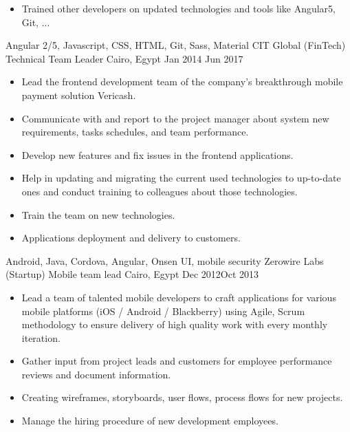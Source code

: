 \begin{experiences}
{\begin{itemize}
                \item Trained other developers on updated technologies and tools like Angular5, Git, ...
            \end{itemize}
        }
        {Angular 2/5, Javascript, CSS, HTML, Git, Sass, Material}
    \emptySeparator
    \experience
        {CIT Global (FinTech)}   {Technical Team Leader}
        {Cairo, Egypt}
        {Jan 2014}{ Jun 2017}
        {
            \begin{itemize}
                \item Lead the frontend development team of the company’s breakthrough
                mobile payment solution Vericash.                                            
                \item Communicate with and report to the project manager about system
                new requirements, tasks schedules, and team performance.
                \item Develop new features and fix issues in the frontend applications.
                \item Help in updating and migrating the current used technologies to up-to-date ones and conduct training to colleagues about those
                technologies.
                \item Train the team on new technologies.
                \item Applications deployment and delivery to customers.
            \end{itemize}
        }
        {Android, Java, Cordova, Angular, Onsen UI, mobile security}  
    \emptySeparator
    \experience
        {Zerowire Labs (Startup)}   {Mobile team lead}
        {Cairo, Egypt}
        {Dec 2012}{Oct 2013}
        {
            \begin{itemize}
                \item Lead a team of talented mobile developers to craft applications for various mobile platforms (iOS / Android / Blackberry) using Agile, Scrum methodology to ensure delivery of high quality work with every monthly iteration.                                            
                \item Gather input from project leads and customers for employee 
                performance reviews and document information.
                \item Creating wireframes, storyboards, user flows, process flows for new projects.
                \item Manage the hiring procedure of new development employees.

\end{itemize}}
\end{experiences}
